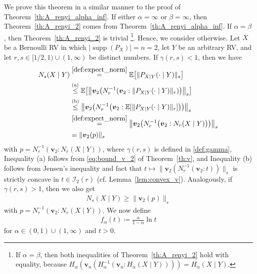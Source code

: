\documentclass[conference, draftcls, onecolumn]{IEEEtran}
\theoremstyle{plain}
\newcommand{\bvec}[1]{\boldsymbol{#1}}
\newcommand{\supp}{\operatorname{supp}}
\newcommand{\lemref}[1]{Lemma~\ref{#1}}
\newcommand{\thref}[1]{Theorem~\ref{#1}}
\begin{document}
\begin{IEEEproof}[Proof of \thref{th:A_renyi_2}]
We prove this theorem in a similar manner to the proof of \thref{th:A_renyi_alpha_inf}.
If either $\alpha = \infty$ or $\beta = \infty$, then \thref{th:A_renyi_2} comes from \thref{th:A_renyi_alpha_inf}.
If $\alpha = \beta$, then \thref{th:A_renyi_2} is trivial%
\footnote{If $\alpha = \beta$, then both inequalities of \thref{th:A_renyi_2} hold with equality, because $H_{\alpha}( \bvec{v}_{n}( H_{\alpha}^{-1}( \bvec{v}_{n} : H_{\alpha}(X \mid Y) ) ) ) = H_{\alpha}(X \mid Y)$.}.
Hence, we consider otherwise.
Let $X$ be a Bernoulli RV in which $|\!\supp( P_{X} )| = n = 2$, let $Y$ be an arbitrary RV, and let $r, s \in [1/2, 1) \cup (1, \infty)$ be distinct numbers.
If $\gamma(r, s) < 1$, then we have
\begin{align}
N_{s}(X \mid Y)
& \overset{\eqref{def:expect_norm}}{=}
\mathbb{E}\big[ \| P_{X|Y}(\cdot \mid Y) \|_{s} \big]
\\
& \overset{\text{(a)}}{\le}
\mathbb{E}\big[ \big\| \bvec{v}_{2}\big( N_{r}^{-1}(\bvec{v}_{2} : \| P_{X|Y}(\cdot \mid Y) \|_{r} ) \big)  \big\|_{s} \big]
\\
& \overset{\text{(b)}}{\le}
\big\| \bvec{v}_{2}\big( N_{r}^{-1}\big(\bvec{v}_{2} : \mathbb{E}[ \| P_{X|Y}(\cdot \mid Y) \|_{r} ] \big) \big)  \big\|_{s}
\\
& \overset{\eqref{def:expect_norm}}{=}
\big\| \bvec{v}_{2}\big( N_{r}^{-1}\big(\bvec{v}_{2} : N_{r}(X \mid Y) \big) \big)  \big\|_{s}
\\
& =
\| \bvec{v}_{2}( p ) \|_{s}
\label{eq:A_renyi_2_proof1}
\end{align}
with $p = N_{r}^{-1}(\bvec{v}_{2} : N_{r}(X \mid Y))$, where $\gamma( r, s )$ is defined in \eqref{def:gamma}, Inequality (a) follows from \eqref{eq:bound_v_2} of \thref{th:v}, and Inequality (b) follows from Jensen's inequality and fact that $t \mapsto \| \bvec{v}_{2}( N_{r}^{-1}( \bvec{v}_{2} : t ) ) \|_{s}$ is strictly concave in $t \in \mathcal{I}_{2}( r )$ (cf. \lemref{lem:convex_v}).
Analogously, if $\gamma(r, s) > 1$, then we also get
\begin{align}
N_{s}(X \mid Y)
\ge
\| \bvec{v}_{2}( p ) \|_{s}
\label{eq:A_renyi_2_proof2}
\end{align}
with $p = N_{r}^{-1}(\bvec{v}_{2} : N_{r}(X \mid Y))$.
We now define
\begin{align}
f_{\alpha}( t )
\coloneqq
\frac{ \alpha }{ 1 - \alpha } \ln t
\end{align}
for $\alpha \in (0, 1) \cup (1, \infty)$ and $t > 0$.

\end{IEEEproof}
\end{document}
